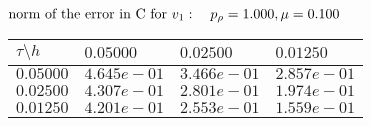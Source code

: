 $
 \text{norm of the error in C for $v_1$}: \quad p_{\rho}=1.000, \mu = 0.100 \\ $
\begin{tabular}{|p{0.6in}|p{1.2in}|p{1.2in}|p{1.2in}|} \hline
$\tau\setminus h$ & $0.05000$ & $0.02500$& $0.01250$ \\ \hline
$0.05000$ & $4.645e-01$ &$3.466e-01$ &$2.857e-01$  \\ \hline
$0.02500$ & $4.307e-01$ &$2.801e-01$ &$1.974e-01$  \\ \hline
$0.01250$ & $4.201e-01$ &$2.553e-01$ &$1.559e-01$  \\ \hline
\end{tabular}\\[20pt]
